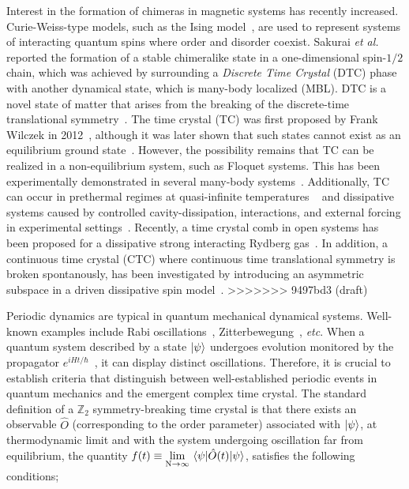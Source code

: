 \documentclass[12pt]{iopart}
\begin{document}
Interest in the formation of chimeras in magnetic systems has recently increased. Curie-Weiss-type models, such as the Ising model~\cite{singh_chimera_2011}, are used to represent systems of interacting quantum spins where order and disorder coexist. Sakurai \textit{et al.}~\cite{sakurai_phys_nodate} reported the formation of a stable chimeralike state in a one-dimensional spin-$1/2$ chain, which was achieved by surrounding a \textit{Discrete Time Crystal} (DTC) phase with another dynamical state, which is many-body localized (MBL). DTC is a novel state of matter that arises from the breaking of the discrete-time translational symmetry~\cite{else_floquet_2016}. The time crystal (TC) was first proposed by Frank Wilczek in 2012~\cite{wilczek_quantum_2012}, although it was later shown that such states cannot exist as an equilibrium ground state~\cite{Bruno_comment_1, Bruno2013, watanabe_absence_2015}. However, the possibility remains that TC can be realized in a non-equilibrium system, such as Floquet systems. This has been experimentally demonstrated in several many-body systems~\cite{huang2018,taheri_all-optical_2022, Soham2018, zhang_observation_2017, yao_time_2018,frey_realization_2022, rovny_observation_2018, sacha_time_nodate,golletz_basis_2022}. Additionally, TC can occur in prethermal regimes at quasi-infinite temperatures ~\cite{Stasiuk2023} and dissipative systems caused by controlled cavity-dissipation, interactions, and external forcing in experimental settings~\cite{Hans2021}. Recently, a time crystal comb in open systems has been proposed for a dissipative strong interacting Rydberg gas~\cite{jiao2024}. In addition, a continuous time crystal (CTC) where continuous time translational symmetry is broken spontanously,  has been investigated by introducing an asymmetric subspace in a driven dissipative spin model~\cite{solanki2024}.
>>>>>>> 9497bd3 (draft)

Periodic dynamics are typical in quantum mechanical dynamical systems. Well-known examples include Rabi oscillations~\cite{Sakurai_Napolitano_2020}, Zitterbewegung~\cite{LeBlanc_2013}, \textit{etc}. When a quantum system described by a state $\ket{\psi}$ undergoes evolution monitored by the propagator $e^{i H t / \hbar}$~\cite{Biao2018,russomanno_floquet_2017}, it can display distinct oscillations. Therefore, it is crucial to establish criteria that distinguish between well-established periodic events in quantum mechanics and the emergent complex time crystal. The standard definition of a $\mathbb{Z}_2$ symmetry-breaking time crystal is that there exists an observable $\hat{O}$ (corresponding to the order parameter) associated with $\ket{\psi}$, at thermodynamic limit and with the system undergoing oscillation far from equilibrium, the quantity
$\displaystyle f(t) \equiv \lim_{\mathrm{N}\to\infty}\expval{\hat{O}(t)}{\psi}$,
satisfies the following conditions;
\end{document}

